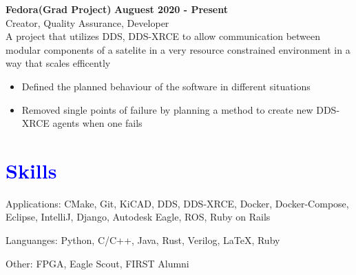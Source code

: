 \documentclass[10pt]{article}
\newcommand{\themeColorOne}{blue}
\newcommand{\sectionColor}{\themeColorOne}
\newcommand{\entrySpacing}{4pt}
\newcommand{\customSection}[1]{
  \section*{\textcolor{\sectionColor}{#1}}
  \vspace{0in}
}
\begin{document}
\noindent\begin{minipage}{\linewidth}
\textbf{Fedora(Grad Project)} \hfill \textbf{Auguest 2020 - Present}\\
Creator, Quality Assurance, Developer\hfill \\A project that utilizes DDS, DDS-XRCE to allow communication between modular components of a satelite in a very resource constrained environment in a way that scales efficently
\begin{itemize}[noitemsep,nolistsep]
\item Defined the planned behaviour of the software in different situations
\item Removed single points of failure by planning a method to create new DDS-XRCE agents when one fails
\end{itemize}


\end{minipage}
\vspace{\entrySpacing}


\customSection{ Skills }
Applications: CMake, Git, KiCAD, DDS, DDS-XRCE, Docker, Docker-Compose, Eclipse, IntelliJ, Django, Autodesk Eagle, ROS, Ruby on Rails

Languanges: Python, C/C++, Java, Rust, Verilog, \LaTeX, Ruby

Other: FPGA, Eagle Scout, FIRST Alumni
\end{document}
